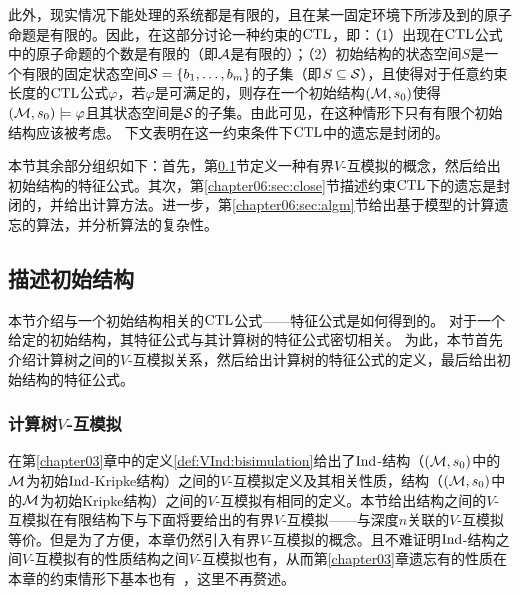 此外，现实情况下能处理的系统都是有限的，且在某一固定环境下所涉及到的原子命题是有限的。因此，在这部分讨论一种约束的$\textrm{CTL}$，即：（1）出现在$\textrm{CTL}$公式中的原子命题的个数是有限的（即${\cal A}$是有限的）；（2）初始结构的状态空间$S$是一个有限的固定状态空间${\cal S}=\{b_1,\ldots,b_m\}$的子集（即$S \subseteq {\cal S}$），且使得对于任意约束长度的$\textrm{CTL}$公式$\varphi$，若$\varphi$是可满足的，则存在一个初始结构$({\cal M},s_0)$使得$({\cal M},s_0)\models \varphi$且其状态空间是${\cal S}$的子集。由此可见，在这种情形下只有有限个初始结构应该被考虑。
下文表明在这一约束条件下$\textrm{CTL}$中的遗忘是封闭的。

本节其余部分组织如下：首先，第\ref{chapter06:sec:des}节定义一种有界$V$-互模拟的概念，然后给出初始结构的特征公式。其次，第\ref{chapter06:sec:close}节描述约束$\textrm{CTL}$下的遗忘是封闭的，并给出计算方法。进一步，第\ref{chapter06:sec:algm}节给出基于模型的计算遗忘的算法，并分析算法的复杂性。


\subsection{描述初始结构}\label{chapter06:sec:des}%
本节介绍与一个初始结构相关的$\textrm{CTL}$公式——特征公式是如何得到的。
对于一个给定的初始结构，其特征公式与其计算树的特征公式密切相关。
为此，本节首先介绍计算树之间的$V$-互模拟关系，然后给出计算树的特征公式的定义，最后给出初始结构的特征公式。

\subsubsection{计算树$V$-互模拟}
在第\ref{chapter03}章中的定义\ref{def:VInd:bisimulation}给出了$\textrm{Ind}$-结构（$({\cal M},s_0)$中的${\cal M}$为初始$\textrm{Ind}$-Kripke结构）之间的$V$-互模拟定义及其相关性质，结构（$({\cal M},s_0)$中的${\cal M}$为初始Kripke结构）之间的$V$-互模拟有相同的定义。本节给出结构之间的$V$-互模拟在有限结构下与下面将要给出的有界$V$-互模拟——与深度$n$关联的$V$-互模拟等价。但是为了方便，本章仍然引入有界$V$-互模拟的概念。且不难证明$\textrm{Ind}$-结构之间$V$-互模拟有的性质结构之间$V$-互模拟也有，从而第\ref{chapter03}章遗忘有的性质在本章的约束情形下基本也有~\cite{renyansfirstpaper}，这里不再赘述。

